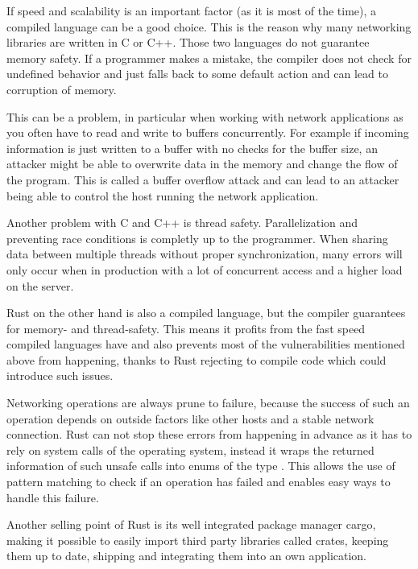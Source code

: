 If speed and scalability is an important factor (as it is most of the time), a compiled language can be a good choice.
This is the reason why many networking libraries are written in C or C++. Those two languages do not guarantee memory
safety. If a programmer makes a mistake, the compiler does not check for undefined behavior and just falls back to some
default action and can lead to corruption of memory.

This can be a problem, in particular when working with network applications as you often have to read and write to
buffers concurrently. For example if incoming information is just written to a buffer with no checks for the buffer
size, an attacker might be able to overwrite data in the memory and change the flow of the program. This is called a
buffer overflow attack and can lead to an attacker being able to control the host running the network application.
\cite{c00buffer}

Another problem with C and C++ is thread safety. Parallelization and preventing race conditions is completly up to the
programmer. When sharing data between multiple threads without proper synchronization, many errors will only occur when
in production with a lot of concurrent access and a higher load on the server.

Rust on the other hand is also a compiled language, but the compiler guarantees for memory- and thread-safety. This
means it profits from the fast speed compiled languages have and also prevents most of the vulnerabilities mentioned
above from happening, thanks to Rust rejecting to compile code which could introduce such issues.

Networking operations are always prune to failure, because the success of such an operation depends on outside factors
like other hosts and a stable network connection. Rust can not stop these errors from happening in advance as it has to
rely on system calls of the operating system, instead it wraps the returned information of such unsafe calls into
enums of the type . This allows the use of pattern matching to check if an operation has
failed and enables easy ways to handle this failure.

Another selling point of Rust is its well integrated package manager cargo, making it possible to easily import third
party libraries called crates, keeping them up to date, shipping and integrating them into an own application.

